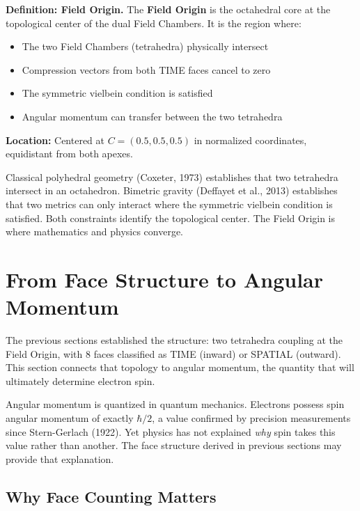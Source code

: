 \documentclass[aps,prd,preprint,superscriptaddress,showpacs,preprintnumbers,amsmath,amssymb,nofootinbib]{revtex4-2}
\begin{document}
\textbf{Definition: Field Origin.} The \textbf{Field Origin} is the octahedral core at the topological center of the dual Field Chambers. It is the region where:
\begin{itemize}
\item The two Field Chambers (tetrahedra) physically intersect
\item Compression vectors from both TIME faces cancel to zero
\item The symmetric vielbein condition is satisfied
\item Angular momentum can transfer between the two tetrahedra
\end{itemize}
\textbf{Location:} Centered at $C = (0.5, 0.5, 0.5)$ in normalized coordinates, equidistant from both apexes.

Classical polyhedral geometry (Coxeter, 1973) establishes that two tetrahedra intersect in an octahedron. Bimetric gravity (Deffayet et al., 2013) establishes that two metrics can only interact where the symmetric vielbein condition is satisfied. Both constraints identify the topological center. The Field Origin is where mathematics and physics converge.

\section{From Face Structure to Angular Momentum}
\label{sec:angular-momentum}

The previous sections established the structure: two tetrahedra coupling at the Field Origin, with 8 faces classified as TIME (inward) or SPATIAL (outward). This section connects that topology to angular momentum, the quantity that will ultimately determine electron spin.

Angular momentum is quantized in quantum mechanics. Electrons possess spin angular momentum of exactly $\hbar/2$, a value confirmed by precision measurements since Stern-Gerlach (1922). Yet physics has not explained \emph{why} spin takes this value rather than another. The face structure derived in previous sections may provide that explanation.

\subsection{Why Face Counting Matters}
\label{subsec:face-counting-matters}
\end{document}
